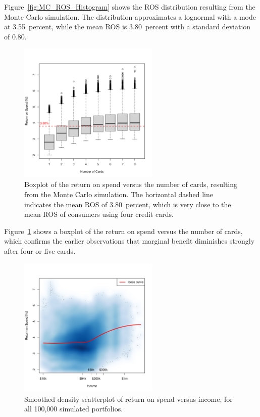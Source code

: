 Figure~\ref{fig:MC_ROS_Histogram} shows the ROS distribution resulting from the Monte Carlo simulation.
The distribution approximates a lognormal with a mode at 3.55~percent, while the mean ROS is 3.80~percent with a standard deviation of 0.80.

\begin{figure}[t!bh]
    \begin{center}
    \includegraphics[width=0.6\textwidth]{../Figures/MC_ROS_vs_K.pdf}
    \caption{Boxplot of the return on spend versus the number of cards, resulting from the Monte Carlo simulation. The horizontal dashed line indicates the mean ROS of 3.80~percent, which is very close to the mean ROS of consumers using four credit cards.}
    \label{fig:MC_ROS_vs_K}
    \end{center}
\end{figure}

Figure~\ref{fig:MC_ROS_vs_K} shows a boxplot of the return on spend versus the number of cards, which confirms the earlier observations that marginal benefit diminishes strongly after four or five cards.

\begin{figure}[t!bh]
    \begin{center}
    \includegraphics[width=0.6\textwidth]{../Figures/MC_ROS_vs_Income.pdf}
    \caption{Smoothed density scatterplot of return on spend versus income, for all 100,000 simulated portfolios.}
    \label{fig:MC_ROS_vs_Income}
    \end{center}
\end{figure}

